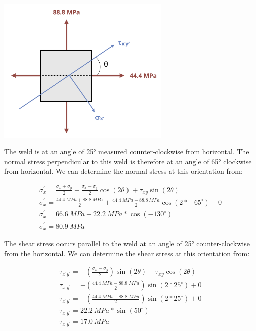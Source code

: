 \documentclass[
  letterpaper,
  DIV=11,
  numbers=noendperiod]{scrreprt}
\theoremstyle{definition}
\theoremstyle{remark}
\begin{document}
\begin{tcolorbox}
\begin{tcolorbox}
\begin{center}
\includegraphics[width=3.26042in,height=\textheight]{images/CH13 PNGs/example 13.2 part 2.png}
\end{center}

The weld is at an angle of 25° measured counter-clockwise from
horizontal. The normal stress perpendicular to this weld is therefore at
an angle of 65° clockwise from horizontal. We can determine the normal
stress at this orientation from:

\[
\begin{gathered}
\sigma_x^{\prime}=\frac{\sigma_x+\sigma_y}{2}+\frac{\sigma_x-\sigma_y}{2} \cos (2 \theta)+\tau_{x y} \sin (2 \theta) \\
\sigma_x^{\prime}=\frac{44.4{~MPa}+88.8{~MPa}}{2}+\frac{44.4{~MPa}-88.8{~MPa}}{2} \cos \left(2 *-65^{\circ}\right)+0 \\
\sigma_x^{\prime}=66.6{~MPa}-22.2{~MPa}*\cos \left(-130^{\circ}\right) \\
\sigma_x^{\prime}=80.9{~MPa}
\end{gathered}
\]

The shear stress occurs parallel to the weld at an angle of 25°
counter-clockwise from the horizontal. We can determine the shear stress
at this orientation from:

\[
\begin{gathered}
\tau_{x^{\prime} y^{\prime}}=-\left(\frac{\sigma_x-\sigma_y}{2}\right) \sin (2 \theta)+\tau_{x y} \cos (2 \theta) \\
\tau_{x^{\prime} y^{\prime}}=-\left(\frac{44.4{~MPa}-88.8{~MPa}}{2}\right) \sin \left(2 * 25^{\circ}\right)+0 \\
\tau_{x^{\prime} y^{\prime}}=-\left(\frac{44.4{~MPa}-88.8{~MPa}}{2}\right) \sin \left(2 * 25^{\circ}\right)+0 \\
\tau_{x^{\prime} y^{\prime}}=22.2{~MPa}* \sin \left(50^{\circ}\right) \\
\tau_{x^{\prime} y^{\prime}}=17.0{~MPa}
\end{gathered}
\]

\end{tcolorbox}

\end{tcolorbox}
\end{document}
